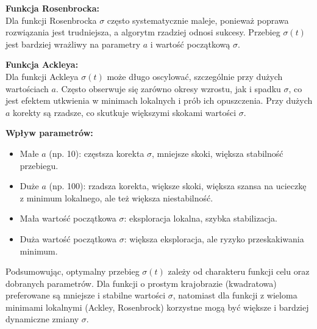 \documentclass[a4paper,12pt]{article}
\begin{document}
\textbf{Funkcja Rosenbrocka:} \\
Dla funkcji Rosenbrocka $\sigma$ często systematycznie maleje, ponieważ poprawa rozwiązania jest trudniejsza, a algorytm rzadziej odnosi sukcesy. Przebieg $\sigma(t)$ jest bardziej wrażliwy na parametry $a$ i wartość początkową $\sigma$.

\textbf{Funkcja Ackleya:} \\
Dla funkcji Ackleya $\sigma(t)$ może długo oscylować, szczególnie przy dużych wartościach $a$. Często obserwuje się zarówno okresy wzrostu, jak i spadku $\sigma$, co jest efektem utkwienia w minimach lokalnych i prób ich opuszczenia. Przy dużych $a$ korekty są rzadsze, co skutkuje większymi skokami wartości $\sigma$.

\textbf{Wpływ parametrów:}
\begin{itemize}
    \item Małe $a$ (np. 10): częstsza korekta $\sigma$, mniejsze skoki, większa stabilność przebiegu.
    \item Duże $a$ (np. 100): rzadsza korekta, większe skoki, większa szansa na ucieczkę z minimum lokalnego, ale też większa niestabilność.
    \item Mała wartość początkowa $\sigma$: eksploracja lokalna, szybka stabilizacja.
    \item Duża wartość początkowa $\sigma$: większa eksploracja, ale ryzyko przeskakiwania minimum.
\end{itemize}

Podsumowując, optymalny przebieg $\sigma(t)$ zależy od charakteru funkcji celu oraz dobranych parametrów. Dla funkcji o prostym krajobrazie (kwadratowa) preferowane są mniejsze i stabilne wartości $\sigma$, natomiast dla funkcji z wieloma minimami lokalnymi (Ackley, Rosenbrock) korzystne mogą być większe i bardziej dynamiczne zmiany $\sigma$.
\end{document}
